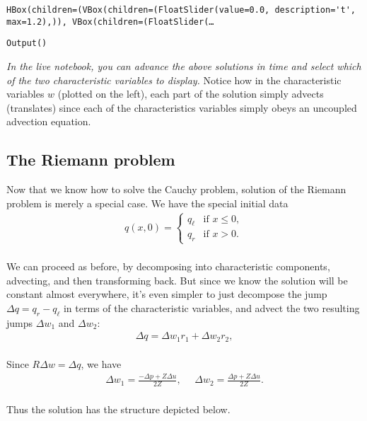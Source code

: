 \documentclass[11pt]{article}
\begin{document}
    
    
    \begin{verbatim}
HBox(children=(VBox(children=(FloatSlider(value=0.0, description='t', max=1.2),)), VBox(children=(FloatSlider(…
    \end{verbatim}

    
    
    \begin{verbatim}
Output()
    \end{verbatim}

    
    \emph{In the live notebook, you can advance the above solutions in time
and select which of the two characteristic variables to display.} Notice
how in the characteristic variables \(w\) (plotted on the left), each
part of the solution simply advects (translates) since each of the
characteristics variables simply obeys an uncoupled advection equation.

    \hypertarget{the-riemann-problem}{%
\subsection{The Riemann problem}\label{the-riemann-problem}}

Now that we know how to solve the Cauchy problem, solution of the
Riemann problem is merely a special case. We have the special initial
data\\
\begin{align*}
q(x,0) = \begin{cases}
q_\ell & \text{if   } x \le 0, \\
q_r & \text{if   } x > 0.
\end{cases}
\end{align*}\\
We can proceed as before, by decomposing into characteristic components,
advecting, and then transforming back. But since we know the solution
will be constant almost everywhere, it's even simpler to just decompose
the jump \(\Delta q = q_r - q_\ell\) in terms of the characteristic
variables, and advect the two resulting jumps \(\Delta w_1\) and
\(\Delta w_2\):\\
\begin{align*}
\Delta q = \Delta w_1 r_1 + \Delta w_2 r_2,
\end{align*}\\
Since \(R\Delta w = \Delta q\), we have\\
\begin{align*}
\Delta w_1 = \frac{-\Delta p + Z\Delta u}{2Z}, \ \ \ \ \ \
\Delta w_2 = \frac{\Delta p + Z\Delta u}{2Z}.
\end{align*}\\
Thus the solution has the structure depicted below.
\end{document}
